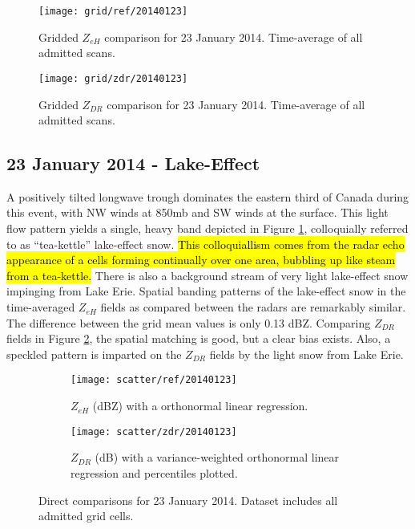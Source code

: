 \begin{figure}[p]
\texttt{[image: grid/ref/20140123]}
\caption{Gridded $Z_{eH}$ comparison for 23 January 2014. Time-average of all admitted scans.} 
\label{fig:grid_ref_20140123}
\end{figure}

\begin{figure}[p]
\texttt{[image: grid/zdr/20140123]}
\caption{Gridded $Z_{DR}$ comparison for 23 January 2014. Time-average of all admitted scans.} 
\label{fig:grid_zdr_20140123}
\end{figure}

\subsection{23 January 2014 - Lake-Effect}
A positively tilted longwave trough dominates the eastern third of Canada during this event, with NW
winds at 850mb and SW winds at the surface. This light flow pattern yields a single, heavy
band depicted in Figure \ref{fig:grid_ref_20140123}, colloquially referred to as ``tea-kettle'' lake-effect
snow. \hl{This colloquiallism comes from the radar echo appearance of a cells forming continually over one area, bubbling up like steam from a tea-kettle.} There is also a background stream of very light lake-effect snow impinging from Lake Erie.
Spatial banding patterns of the lake-effect snow in the time-averaged $Z_{eH}$ fields as compared 
between the radars are remarkably similar. The difference between the grid mean values is only
0.13 dBZ. Comparing $Z_{DR}$ fields in Figure \ref{fig:grid_zdr_20140123}, the spatial matching is good, but a clear bias exists. Also, a speckled pattern is imparted on the $Z_{DR}$ fields
by the light snow from Lake Erie. 
\begin{figure}[H]
\centering
   \begin{subfigure}[t]{0.48\linewidth} \centering
     \texttt{[image: scatter/ref/20140123]}
     \caption{$Z_{eH}$ (dBZ) with a orthonormal linear regression.}\label{fig:scatter_ref_20140123}
   \end{subfigure}
   \begin{subfigure}[t]{0.48\linewidth} \centering
     \texttt{[image: scatter/zdr/20140123]}
     \caption{$Z_{DR}$ (dB) with a variance-weighted orthonormal linear regression and percentiles plotted.}\label{fig:scatter_zdr_20140123}
   \end{subfigure}
\caption{Direct comparisons for 23 January 2014. Dataset includes all admitted grid cells.}
\label{fig:scatter_20140123}
\end{figure}
